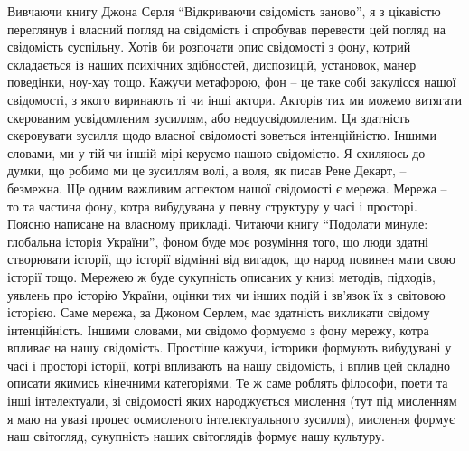 Вивчаючи книгу Джона Серля \enquote{Відкриваючи свідомість заново}, я з цікавістю
переглянув і власний погляд на свідомість і спробував перевести цей погляд на
свідомість суспільну. Хотів би розпочати опис свідомості з фону, котрий
складається із наших психічних здібностей, диспозицій, установок, манер
поведінки, ноу-хау тощо. Кажучи метафорою, фон – це таке собі закулісся нашої
свідомості, з якого виринають ті чи інші актори. Акторів тих ми можемо витягати
скерованим усвідомленим зусиллям, або недоусвідомленим. Ця здатність
скеровувати зусилля щодо власної свідомості зоветься інтенційністю. Іншими
словами, ми у тій чи іншій мірі керуємо нашою свідомістю. Я схиляюсь до думки,
що робимо ми це зусиллям волі, а воля, як писав Рене Декарт, – безмежна. Ще
одним важливим аспектом нашої свідомості є мережа. Мережа – то та частина фону,
котра вибудувана у певну структуру у часі і просторі. Поясню написане на
власному прикладі. Читаючи книгу \enquote{Подолати минуле: глобальна історія України},
фоном буде моє розуміння того, що люди здатні створювати історії, що історії
відмінні від вигадок, що народ повинен мати свою історії тощо. Мережею ж буде
сукупність описаних у книзі методів, підходів, уявлень про історію України,
оцінки тих чи інших подій і зв’язок їх з світовою історією. Саме мережа, за
Джоном Серлем, має здатність викликати свідому інтенційність. Іншими словами,
ми свідомо формуємо з фону мережу, котра впливає на нашу свідомість. Простіше
кажучи, історики формують вибудувані у часі і просторі історії, котрі впливають
на нашу свідомість, і вплив цей складно описати якимись кінечними категоріями.
Те ж саме роблять філософи, поети та інші інтелектуали, зі свідомості яких
народжується мислення (тут під мисленням я маю на увазі процес осмисленого
інтелектуального зусилля), мислення формує наш світогляд, сукупність наших
світоглядів формує нашу культуру.


